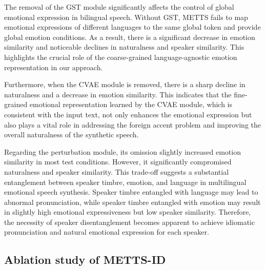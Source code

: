 \documentclass[journal,comsoc]{IEEEtran}
\begin{document}
The removal of the GST module significantly affects the control of global emotional expression in bilingual speech. Without GST, METTS fails to map emotional expressions of different languages to the same global token and provide global emotion conditions. As a result, there is a significant decrease in emotion similarity and noticeable declines in naturalness and speaker similarity. This highlights the crucial role of the coarse-grained language-agnostic emotion representation in our approach.

Furthermore, when the CVAE module is removed, there is a sharp decline in naturalness and a decrease in emotion similarity. This indicates that the fine-grained emotional representation learned by the CVAE module, which is consistent with the input text, not only enhances the emotional expression but also plays a vital role in addressing the foreign accent problem and improving the overall naturalness of the synthetic speech.


Regarding the perturbation module, its omission slightly increased emotion similarity in most test conditions. However, it significantly compromised naturalness and speaker similarity. This trade-off suggests a substantial entanglement between speaker timbre, emotion, and language in multilingual emotional speech synthesis. Speaker timbre entangled with language may lead to abnormal pronunciation, while speaker timbre entangled with emotion may result in slightly high emotional expressiveness but low speaker similarity. Therefore, the necessity of speaker disentanglement becomes apparent to achieve idiomatic pronunciation and natural emotional expression for each speaker.


\subsection{Ablation study of METTS-ID}
\end{document}
